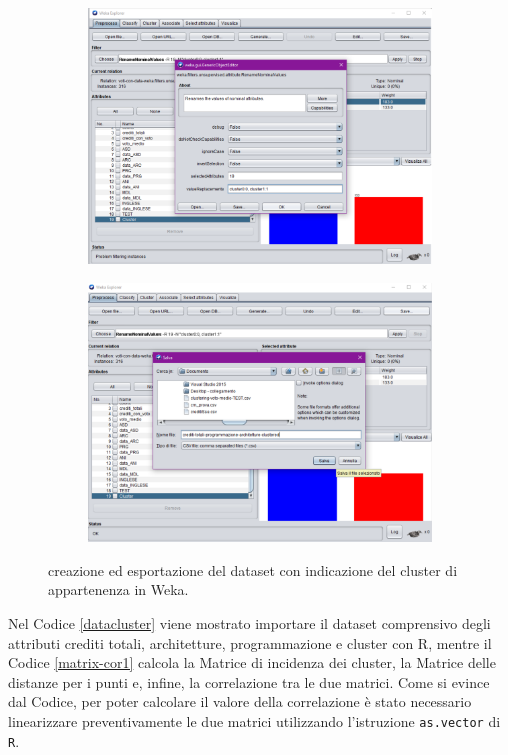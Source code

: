 \documentclass[12pt]{article}
\begin{document}
\begin{figure}
	\begin{subfigure}[b]{0.496\textwidth}
		\includegraphics[width=\textwidth]{img/save-cluster-ass-3.pdf}
		\end{subfigure}
		\begin{subfigure}[b]{0.496\textwidth}
		\includegraphics[width=\textwidth]{img/save-cluster-ass-4.pdf}
		\end{subfigure}
		\caption{creazione ed esportazione del dataset con indicazione del cluster di appartenenza in Weka.}
		\label{fig:add-cluster}
\end{figure}

Nel Codice \ref{datacluster} viene mostrato importare il dataset comprensivo degli attributi crediti totali, architetture, programmazione e cluster con R, mentre il Codice \ref{matrix-cor1} calcola la Matrice di incidenza dei cluster, la Matrice delle distanze per i punti e, infine, la correlazione tra le due matrici. Come si evince dal Codice, per poter calcolare il valore della correlazione è stato necessario linearizzare preventivamente le due matrici utilizzando l'istruzione \texttt{as.vector} di \texttt{R}.
\end{document}
